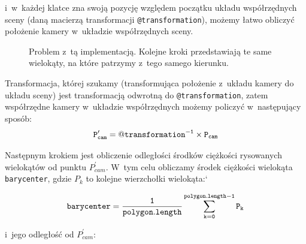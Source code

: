 \documentclass[a4paper]{article}
\begin{document}
{i~w~każdej klatce zna swoją pozycję względem początku układu współrzędnych sceny (daną macierzą transformacji \texttt{@transformation}), możemy łatwo obliczyć położenie kamery w~układzie współrzędnych sceny.
\begin{figure}[h]
  \centering
  \caption{Problem z~tą implementacją. Kolejne kroki przedstawiają te same wielokąty, na które patrzymy z~tego samego kierunku.}
  \label{problemy}
\end{figure}

Transformacja, której szukamy (transformująca położenie z~układu kamery do układu sceny) jest transformacją odwrotną do \texttt{@transformation}, zatem współrzędne kamery w~układzie współrzędnych możemy policzyć w~następujący sposób:
$$
\tt{} P_{cam}^\prime = \tt{@transformation}\tt^{-1} \times P_{cam}
$$

Następnym krokiem jest obliczenie odległości środków ciężkości rysowanych wielokątów od punktu $P_{cam}^\prime$. 
W~tym celu obliczamy środek ciężkości wielokąta \texttt{barycenter}, gdzie $P_k$ to kolejne wierzchołki wielokąta:`

$$ \tt{barycenter} =\frac{1}{\tt{polygon.length}}  \sum_{k=0}^{\tt{polygon.length-1}} P_k $$

i~jego odległość od $P_{cam}^\prime$:

}
\end{document}
